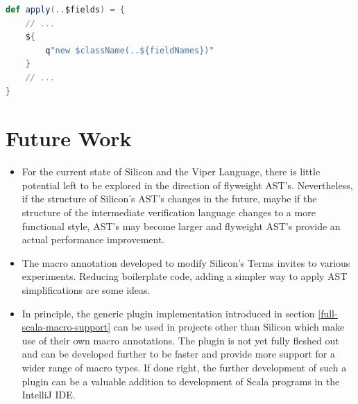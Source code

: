 \documentclass[11pt]{article}
\begin{document}
    \begin{lstlisting}[language=Scala, caption=Modified macro to ignore AST simplifications.]
def apply(..$fields) = {
    // ...
    ${
        q"new $className(..${fieldNames})"
    }
    // ...
}  
    \end{lstlisting}


    \newpage
    \section{Future Work}

    \begin{itemize}
        \item For the current state of Silicon and the Viper Language,
            there is little potential left to be explored in the direction
            of flyweight AST's. Nevertheless, if the structure of Silicon's AST's
            changes in the future, maybe if the structure of the intermediate verification
            language changes to a more functional style, AST's may become larger and
            flyweight AST's provide an actual performance improvement.
        \item The macro annotation developed to modify Silicon's Terms
            invites to various experiments. Reducing boilerplate code,
            adding a simpler way to apply AST simplifications are some
            ideas.
        \item In principle, the generic plugin implementation introduced in
            section \ref{full-scala-macro-support} can be used in projects other
            than Silicon which make use of their own macro annotations.
            The plugin is not yet fully fleshed out and can be developed
            further to be faster and provide more support for a
            wider range of macro types. If done right, the further development
            of such a plugin can be a valuable addition to
            development of Scala programs in the IntelliJ IDE.
    \end{itemize}

    \newpage
\end{document}
